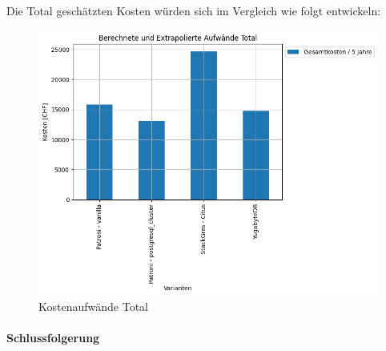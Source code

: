 \begin{flushleft}
    Die Total geschätzten Kosten würden sich im Vergleich wie folgt entwickeln:
    \begin{figure}[H]
        \centering
        \includegraphics[width=1\linewidth]{source/pandas_data_chart_plotter/cost_investment_summe}
        \caption{Kostenaufwände Total}
        \label{fig:cost_investment_summe}
    \end{figure}
\end{flushleft}
\begin{flushleft}
    \paragraph{Schlussfolgerung}
\end{flushleft}
